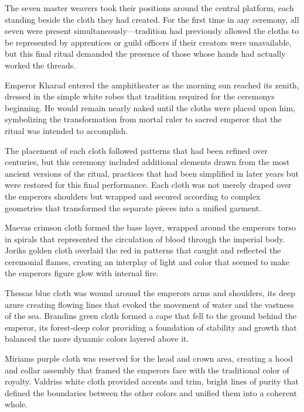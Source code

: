 The seven master weavers took their positions around the central
platform, each standing beside the cloth they had created. For the first
time in any ceremony, all seven were present simultaneously---tradition
had previously allowed the cloths to be represented by apprentices or
guild officers if their creators were unavailable, but this final ritual
demanded the presence of those whose hands had actually worked the
threads.

Emperor Kharad entered the amphitheater as the morning sun reached its
zenith, dressed in the simple white robes that tradition required for
the ceremony\textquotesingle s beginning. He would remain nearly naked
until the cloths were placed upon him, symbolizing the transformation
from mortal ruler to sacred emperor that the ritual was intended to
accomplish.

The placement of each cloth followed patterns that had been refined over
centuries, but this ceremony included additional elements drawn from the
most ancient versions of the ritual, practices that had been simplified
in later years but were restored for this final performance. Each cloth
was not merely draped over the emperor\textquotesingle s shoulders but
wrapped and secured according to complex geometries that transformed the
separate pieces into a unified garment.

Maeva\textquotesingle s crimson cloth formed the base layer, wrapped
around the emperor\textquotesingle s torso in spirals that represented
the circulation of blood through the imperial body.
Jorik\textquotesingle s golden cloth overlaid the red in patterns that
caught and reflected the ceremonial flames, creating an interplay of
light and color that seemed to make the emperor\textquotesingle s figure
glow with internal fire.

Thessa\textquotesingle s blue cloth was wound around the
emperor\textquotesingle s arms and shoulders, its deep azure creating
flowing lines that evoked the movement of water and the vastness of the
sea. Brandin\textquotesingle s green cloth formed a cape that fell to
the ground behind the emperor, its forest-deep color providing a
foundation of stability and growth that balanced the more dynamic colors
layered above it.

Miriam\textquotesingle s purple cloth was reserved for the head and
crown area, creating a hood and collar assembly that framed the
emperor\textquotesingle s face with the traditional color of royalty.
Valdris\textquotesingle s white cloth provided accents and trim, bright
lines of purity that defined the boundaries between the other colors and
unified them into a coherent whole.

